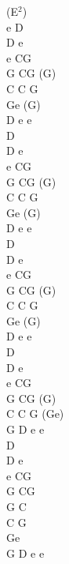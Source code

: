 \documentclass[a5paper, 10pt]{book}
\begin{document}
\begin{minipage}[t]{0.15\textwidth}
  (E$^2$)\\
  e D\\
  D e\\
  e CG\\
  G CG (G)\\
  C C G\\
  Ge (G)\\
  D e e\\

  D\\
  D e\\
  e CG\\
  G CG (G)\\
  C C G\\
  Ge (G)\\
  D e e\\

  D\\
  D e\\
  e CG\\
  G CG (G)\\
  C C G\\
  Ge (G)\\
  D e e\\

  D\\
  D e\\
  e CG\\
  G CG (G)\\
  C C G (Ge)\\
  G D e e\\

  D\\
  D e\\
  e CG\\
  G CG\\
  G C\\
  C G\\
  Ge\\
  G D e e\\
\end{minipage}
\end{document}
